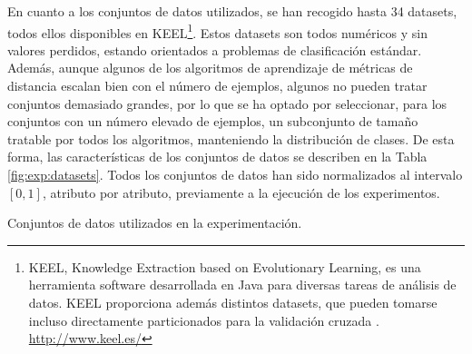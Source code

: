 En cuanto a los conjuntos de datos utilizados, se han recogido hasta 34 datasets, todos ellos disponibles en KEEL\footnote{KEEL, Knowledge Extraction based on Evolutionary Learning, es una herramienta software desarrollada en Java para diversas tareas de análisis de datos. KEEL proporciona además distintos datasets, que pueden tomarse incluso directamente particionados para la validación cruzada \cite{keel}. \url{http://www.keel.es/}}. Estos datasets son todos numéricos y sin valores perdidos, estando orientados a problemas de clasificación estándar. Además, aunque algunos de los algoritmos de aprendizaje de métricas de distancia escalan bien con el número de ejemplos, algunos no pueden tratar conjuntos demasiado grandes, por lo que se ha optado por seleccionar, para los conjuntos con un número elevado de ejemplos, un subconjunto de tamaño tratable por todos los algoritmos, manteniendo la distribución de clases. De esta forma, las características de los conjuntos de datos se describen en la Tabla \ref{fig:exp:datasets}. Todos los conjuntos de datos han sido normalizados al intervalo $[0,1]$, atributo por atributo, previamente a la ejecución de los experimentos.

\begin{table}[h]
\centering
\resizebox{0.7\textwidth}{!}{%
    
}
\caption{Conjuntos de datos utilizados en la experimentación.} \label{fig:exp:datasets}
\end{table}

